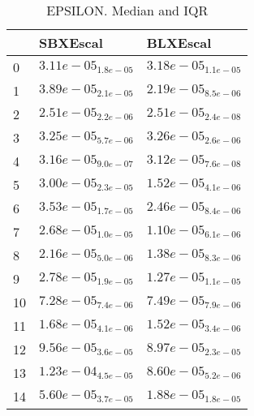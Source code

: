 \documentclass{article}
\begin{document}
\begin{table}
\caption{EPSILON. Median and IQR}
\label{table:median.EPSILON}
\begin{scriptsize}
\centering
\begin{tabular}{lll}
\hline & SBXEscal &  BLXEscal\\
\hline
0 & \cellcolor{gray95}$  3.11e-05_{ 1.8e-05}$ & $  3.18e-05_{ 1.1e-05}$ \\
1 & \cellcolor{gray25}$  3.89e-05_{ 2.1e-05}$ & \cellcolor{gray95}$  2.19e-05_{ 8.5e-06}$ \\
2 & \cellcolor{gray25}$  2.51e-05_{ 2.2e-06}$ & \cellcolor{gray95}$  2.51e-05_{ 2.4e-08}$ \\
3 & \cellcolor{gray95}$  3.25e-05_{ 5.7e-06}$ & $  3.26e-05_{ 2.6e-06}$ \\
4 & \cellcolor{gray25}$  3.16e-05_{ 9.0e-07}$ & \cellcolor{gray95}$  3.12e-05_{ 7.6e-08}$ \\
5 & \cellcolor{gray25}$  3.00e-05_{ 2.3e-05}$ & \cellcolor{gray95}$  1.52e-05_{ 4.1e-06}$ \\
6 & \cellcolor{gray25}$  3.53e-05_{ 1.7e-05}$ & \cellcolor{gray95}$  2.46e-05_{ 8.4e-06}$ \\
7 & \cellcolor{gray25}$  2.68e-05_{ 1.0e-05}$ & \cellcolor{gray95}$  1.10e-05_{ 6.1e-06}$ \\
8 & \cellcolor{gray25}$  2.16e-05_{ 5.0e-06}$ & \cellcolor{gray95}$  1.38e-05_{ 8.3e-06}$ \\
9 & \cellcolor{gray25}$  2.78e-05_{ 1.9e-05}$ & \cellcolor{gray95}$  1.27e-05_{ 1.1e-05}$ \\
10 & \cellcolor{gray95}$  7.28e-05_{ 7.4e-06}$ & $  7.49e-05_{ 7.9e-06}$ \\
11 & \cellcolor{gray25}$  1.68e-05_{ 4.1e-06}$ & \cellcolor{gray95}$  1.52e-05_{ 3.4e-06}$ \\
12 & \cellcolor{gray25}$  9.56e-05_{ 3.6e-05}$ & \cellcolor{gray95}$  8.97e-05_{ 2.3e-05}$ \\
13 & \cellcolor{gray25}$  1.23e-04_{ 4.5e-05}$ & \cellcolor{gray95}$  8.60e-05_{ 5.2e-06}$ \\
14 & \cellcolor{gray25}$  5.60e-05_{ 3.7e-05}$ & \cellcolor{gray95}$  1.88e-05_{ 1.8e-05}$ \\
\hline
\end{tabular}
\end{scriptsize}
\end{table}
\end{document}
